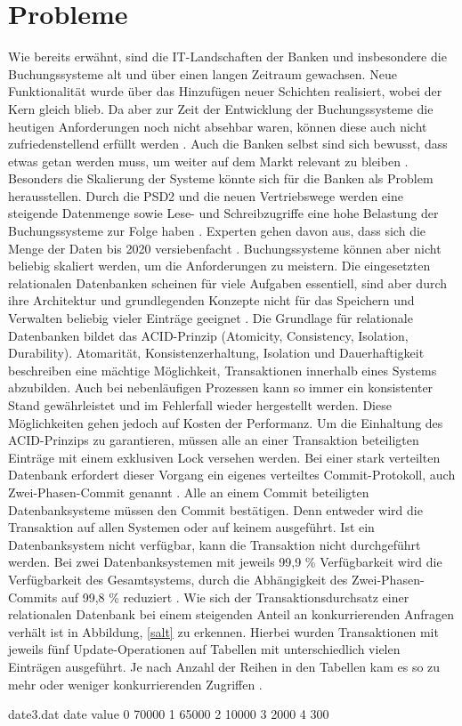 \documentclass[12pt,oneside,a4paper,parskip]{scrbook}
\begin{document}
\section{Probleme}
\label{problems}
Wie bereits erwähnt, sind die IT-Landschaften der Banken und insbesondere die Buchungssysteme alt und über einen langen Zeitraum gewachsen. Neue Funktionalität wurde über das Hinzufügen neuer Schichten realisiert, wobei der Kern gleich blieb. Da aber zur Zeit der Entwicklung der Buchungssysteme die heutigen Anforderungen noch nicht absehbar waren, können diese auch nicht zufriedenstellend erfüllt werden \cite[23-27]{ITidF}\cite{bankEnzy}. Auch die Banken selbst sind sich bewusst, dass etwas getan werden muss, um weiter auf dem Markt relevant zu bleiben \cite{capgemini}.
Besonders die Skalierung der Systeme könnte sich für die Banken als Problem herausstellen. Durch die PSD2 und die neuen Vertriebswege werden eine steigende Datenmenge sowie Lese- und Schreibzugriffe eine hohe Belastung der Buchungssysteme zur Folge haben \cite{bigdataBigStorage}. Experten gehen davon aus, dass sich die Menge der Daten bis 2020 versiebenfacht \cite{versiebenfacht}. Buchungssysteme können aber nicht beliebig skaliert werden, um die Anforderungen zu meistern. Die eingesetzten relationalen Datenbanken scheinen für viele Aufgaben essentiell, sind aber durch ihre Architektur und grundlegenden Konzepte nicht für das Speichern und Verwalten beliebig vieler Einträge geeignet \cite{rdbmsBigData}. Die Grundlage für relationale Datenbanken bildet das ACID-Prinzip (Atomicity, Consistency, Isolation, Durability). Atomarität, Konsistenzerhaltung, Isolation und Dauerhaftigkeit beschreiben eine mächtige Möglichkeit, Transaktionen innerhalb eines Systems abzubilden. Auch bei nebenläufigen Prozessen kann so immer ein konsistenter Stand gewährleistet und im Fehlerfall wieder hergestellt werden. Diese Möglichkeiten gehen jedoch auf Kosten der Performanz. Um die Einhaltung des ACID-Prinzips zu garantieren, müssen alle an einer Transaktion beteiligten Einträge mit einem exklusiven Lock versehen werden. Bei einer stark verteilten Datenbank erfordert dieser Vorgang ein eigenes verteiltes Commit-Protokoll, auch Zwei-Phasen-Commit genannt \cite{dbarchitecture}. Alle an einem Commit beteiligten Datenbanksysteme müssen den Commit bestätigen. Denn entweder wird die Transaktion auf allen Systemen oder auf keinem ausgeführt. Ist ein Datenbanksystem nicht verfügbar, kann die Transaktion nicht durchgeführt werden. Bei zwei Datenbanksystemen mit jeweils 99,9 \% Verfügbarkeit wird die Verfügbarkeit des Gesamtsystems, durch die Abhängigkeit des Zwei-Phasen-Commits auf 99,8 \% reduziert \cite{BASE}. Wie sich der Transaktionsdurchsatz einer relationalen Datenbank bei einem steigenden Anteil an konkurrierenden Anfragen verhält ist in Abbildung, \ref{salt} zu erkennen. Hierbei wurden Transaktionen mit jeweils fünf Update-Operationen auf Tabellen mit unterschiedlich vielen Einträgen ausgeführt. Je nach Anzahl der Reihen in den Tabellen kam es so zu mehr oder weniger konkurrierenden Zugriffen \cite{salt}.
\begin{filecontents}{date3.dat}
date  value
0     70000
1     65000
2     10000
3     2000
4     300
\end{filecontents}
\end{document}
